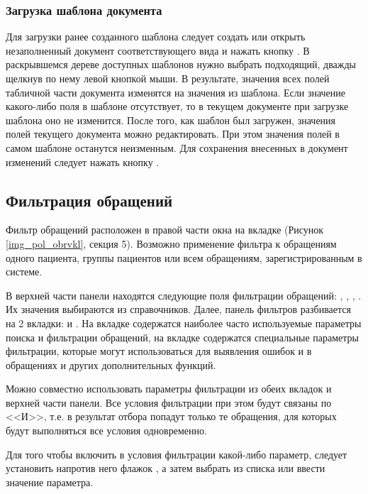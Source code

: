 \subsubsection{Загрузка шаблона документа}

Для загрузки ранее созданного шаблона следует создать или открыть незаполненный документ соответствующего вида и нажать кнопку . В раскрывшемся дереве доступных шаблонов нужно выбрать подходящий, дважды щелкнув по нему левой кнопкой мыши. В результате, значения всех полей табличной части документа изменятся на значения из шаблона. Если значение какого-либо поля в шаблоне отсутствует, то в текущем документе при загрузке шаблона оно не изменится. После того, как шаблон был загружен, значения полей текущего документа можно редактировать. При этом значения полей в самом шаблоне останутся неизменным. Для сохранения внесенных в документ изменений следует нажать кнопку .

\subsection{Фильтрация обращений} \label{pol_obr_filtr}

Фильтр обращений расположен в правой части окна на вкладке  (Рисунок \ref{img_pol_obrvkl}, секция 5). Возможно применение фильтра к обращениям одного пациента, группы пациентов или всем обращениям, зарегистрированным в системе.

В верхней части панели  находятся следующие поля фильтрации обращений: , , , . Их значения выбираются из справочников. Далее, панель фильтров разбивается на 2 вкладки:  и . На вкладке  содержатся наиболее часто используемые параметры поиска и фильтрации обращений, на вкладке  содержатся специальные параметры фильтрации, которые могут использоваться для выявления ошибок и в обращениях и других дополнительных функций.

Можно совместно использовать параметры фильтрации из обеих вкладок и верхней части панели. Все условия фильтрации при этом будут связаны по <<И>>, т.е. в результат отбора попадут только те обращения, для которых будут выполняться все условия одновременно.

Для того чтобы включить в условия фильтрации какой-либо параметр, следует установить напротив него флажок \putx , а затем выбрать из списка или ввести значение параметра.

